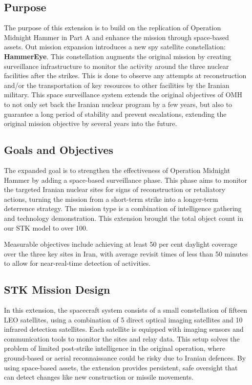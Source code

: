 \documentclass{article}
\begin{document}
\subsection{Purpose}
The purpose of this extension is to build on the replication of Operation Midnight Hammer in Part A and enhance the mission through space-based assets. Out mission expansion introduces a new spy satellite constellation: \textbf{HammerEye}. This constellation augments the original mission by creating surveillance infrastructure to monitor the activity around the three nuclear facilities after the strikes. This is done to observe any attempts at reconstruction and/or the transportation of key resources to other facilities by the Iranian military. This space surveillance system extends the original objectives of OMH to not only set back the Iranian nuclear program by a few years, but also to guarantee a long period of stability and prevent escalations, extending the original mission objective by several years into the future.

\subsection{Goals and Objectives}
The expanded goal is to strengthen the effectiveness of Operation Midnight Hammer by adding a space-based surveillance phase. This phase aims to monitor the targeted Iranian nuclear sites for signs of reconstruction or retaliatory actions, turning the mission from a short-term strike into a longer-term deterrence strategy. The mission type is a combination of intelligence gathering and technology demonstration. This extension brought the total object count in our STK model to over 100.

Measurable objectives include achieving at least 50 per cent daylight coverage over the three key sites in Iran, with average revisit times of less than 50 minutes to allow for near-real-time detection of activities.

\subsection{STK Mission Design}
In this extension, the spacecraft system consists of a small constellation of fifteen LEO satellites, using a combination of 5 direct optical imaging satellites and 10 infrared detection satellites. Each satellite is equipped with imaging sensors and communication tools to monitor the sites and relay data. This setup solves the problem of limited post-strike intelligence in the original operation, where ground-based or aerial reconnaissance could be risky due to Iranian defences. By using space-based assets, the extension provides persistent, safe oversight that can detect changes like new construction or missile movements.
\end{document}

